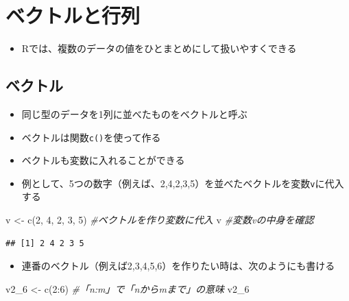 \documentclass[
]{book}
\newenvironment{Shaded}{\begin{snugshade}}{\end{snugshade}}
\newcommand{\CommentTok}[1]{\textcolor[rgb]{0.56,0.35,0.01}{\textit{#1}}}
\newcommand{\DecValTok}[1]{\textcolor[rgb]{0.00,0.00,0.81}{#1}}
\newcommand{\FunctionTok}[1]{\textcolor[rgb]{0.00,0.00,0.00}{#1}}
\newcommand{\NormalTok}[1]{#1}
\newcommand{\OtherTok}[1]{\textcolor[rgb]{0.56,0.35,0.01}{#1}}
\newcommand{\SpecialCharTok}[1]{\textcolor[rgb]{0.00,0.00,0.00}{#1}}
\providecommand{\tightlist}{%
  \setlength{\itemsep}{0pt}\setlength{\parskip}{0pt}}
\begin{document}
\hypertarget{ux30d9ux30afux30c8ux30ebux3068ux884cux5217}{%
\section{ベクトルと行列}\label{ux30d9ux30afux30c8ux30ebux3068ux884cux5217}}

\begin{itemize}
\tightlist
\item
  Rでは、複数のデータの値をひとまとめにして扱いやすくできる
\end{itemize}

\hypertarget{ux30d9ux30afux30c8ux30eb}{%
\subsection{ベクトル}\label{ux30d9ux30afux30c8ux30eb}}

\begin{itemize}
\tightlist
\item
  同じ型のデータを1列に並べたものをベクトルと呼ぶ
\item
  ベクトルは関数\texttt{c()}を使って作る
\item
  ベクトルも変数に入れることができる
\item
  例として、5つの数字（例えば、2,4,2,3,5）を並べたベクトルを変数\texttt{v}に代入する
\end{itemize}

\begin{Shaded}
\begin{Highlighting}[]
\NormalTok{v }\OtherTok{\textless{}{-}} \FunctionTok{c}\NormalTok{(}\DecValTok{2}\NormalTok{, }\DecValTok{4}\NormalTok{, }\DecValTok{2}\NormalTok{, }\DecValTok{3}\NormalTok{, }\DecValTok{5}\NormalTok{) }\CommentTok{\#ベクトルを作り変数に代入}
\NormalTok{v }\CommentTok{\#変数vの中身を確認}
\end{Highlighting}
\end{Shaded}

\begin{verbatim}
## [1] 2 4 2 3 5
\end{verbatim}

\begin{itemize}
\tightlist
\item
  連番のベクトル（例えば2,3,4,5,6）を作りたい時は、次のようにも書ける
\end{itemize}

\begin{Shaded}
\begin{Highlighting}[]
\NormalTok{v2\_6 }\OtherTok{\textless{}{-}} \FunctionTok{c}\NormalTok{(}\DecValTok{2}\SpecialCharTok{:}\DecValTok{6}\NormalTok{) }\CommentTok{\#「n:m」で「nからmまで」の意味}
\NormalTok{v2\_6}
\end{Highlighting}
\end{Shaded}
\end{document}
